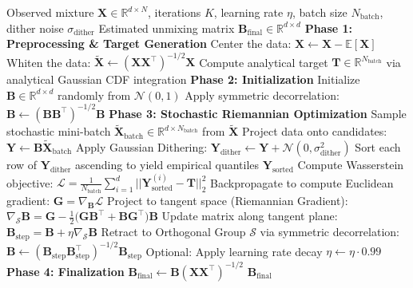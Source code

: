 \documentclass[12pt,a4paper,twoside,openany]{book}
\begin{document}
\begin{algorithm}[H]
\caption{The Optimal Transport ICA (OT-ICA) Algorithm}
\label{alg:ot_ica}
\begin{algorithmic}[1]
\Require Observed mixture $\mathbf{X} \in \mathbb{R}^{d \times N}$, iterations $K$, learning rate $\eta$, batch size $N_{\text{batch}}$, dither noise $\sigma_{\text{dither}}$
\Ensure Estimated unmixing matrix $\mathbf{B}_{\text{final}} \in \mathbb{R}^{d \times d}$
\State \textbf{Phase 1: Preprocessing \& Target Generation}
\State Center the data: $\mathbf{X} \gets \mathbf{X} - \mathbb{E}[\mathbf{X}]$
\State Whiten the data: $\widetilde{\mathbf{X}} \gets (\mathbf{X}\mathbf{X}^\top)^{-1/2} \mathbf{X}$ 
\State Compute analytical target $\mathbf{T} \in \mathbb{R}^{N_{\text{batch}}}$ via analytical Gaussian CDF integration
\State \textbf{Phase 2: Initialization}
\State Initialize $\mathbf{B} \in \mathbb{R}^{d \times d}$ randomly from $\mathcal{N}(0,1)$
\State Apply symmetric decorrelation:
\Statex \qquad $\mathbf{B} \gets (\mathbf{B}\mathbf{B}^\top)^{-1/2} \mathbf{B}$ 
\State \textbf{Phase 3: Stochastic Riemannian Optimization}
    \State Sample stochastic mini-batch $\widetilde{\mathbf{X}}_{\text{batch}} \in \mathbb{R}^{d \times N_{\text{batch}}}$ from $\widetilde{\mathbf{X}}$
    \State Project data onto candidates: $\mathbf{Y} \gets \mathbf{B} \widetilde{\mathbf{X}}_{\text{batch}}$
    \State Apply Gaussian Dithering: $\mathbf{Y}_{\text{dither}} \gets \mathbf{Y} + \mathcal{N}(0, \sigma_{\text{dither}}^2)$
    \State Sort each row of $\mathbf{Y}_{\text{dither}}$ ascending to yield empirical quantiles $\mathbf{Y}_{\text{sorted}}$
    \State Compute Wasserstein objective:
    \Statex \qquad $\mathcal{L} = \frac{1}{N_{\text{batch}}} \sum_{i=1}^{d} ||\mathbf{Y}_{\text{sorted}}^{(i)} - \mathbf{T}||_2^2$
    \State Backpropagate to compute Euclidean gradient: $\mathbf{G} = \nabla_{\mathbf{B}} \mathcal{L}$
    \State Project to tangent space (Riemannian Gradient): 
    \Statex \qquad $\nabla_{\mathcal{S}} \mathbf{B} = \mathbf{G} - \frac{1}{2}\big(\mathbf{G}\mathbf{B}^\top + \mathbf{B}\mathbf{G}^\top \big)\mathbf{B}$
    \State Update matrix along tangent plane:
    \Statex \qquad $\mathbf{B}_{\text{step}} = \mathbf{B} + \eta \nabla_{\mathcal{S}} \mathbf{B}$ 
    \State Retract to Orthogonal Group $\mathcal{S}$ via symmetric decorrelation: 
    \Statex \qquad $\mathbf{B} \gets (\mathbf{B}_{\text{step}}\mathbf{B}_{\text{step}}^\top)^{-1/2} \mathbf{B}_{\text{step}}$
    \State Optional: Apply learning rate decay $\eta \gets \eta \cdot 0.99$
\EndFor
\State \textbf{Phase 4: Finalization}
\State $\mathbf{B}_{\text{final}} \gets \mathbf{B} (\mathbf{X}\mathbf{X}^\top)^{-1/2}$ 
\State \Return $\mathbf{B}_{\text{final}}$
\end{algorithmic}
\end{algorithm}
\end{document}
